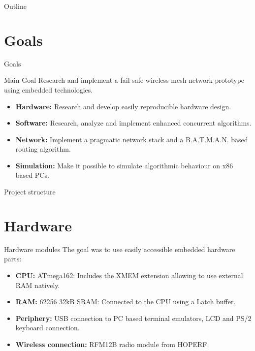 \begin{frame}
\titlepage
\end{frame}

\begin{frame}{Outline}
\tableofcontents
\end{frame}

\section{Goals}
\begin{frame}{Goals}

\begin{exampleblock}{Main Goal}
Research and implement a fail-safe wireless mesh network prototype using embedded technologies.
\end{exampleblock}

\begin{itemize}
    \item \textbf{Hardware:} Research and develop easily reproducible hardware design.
    \item \textbf{Software:} Research, analyze and implement enhanced concurrent algorithms.
    \item \textbf{Network:} Implement a pragmatic network stack and a B.A.T.M.A.N. based routing algorithm.
    \item \textbf{Simulation:} Make it possible to simulate algorithmic behaviour on x86 based PCs.
\end{itemize} 
\end{frame}

\begin{frame}{Project structure}
\begin{center}
\scalebox{0.56} {
}
\end{center}
\end{frame}

\section{Hardware}
\begin{frame}{Hardware modules}
The goal was to use easily accessible embedded hardware parts:

\begin{itemize}
    \item \textbf{CPU:} ATmega162: Includes the XMEM extension allowing to use external RAM natively.
    \item \textbf{RAM:} 62256 32kB SRAM: Connected to the CPU using a Latch buffer.
    \item \textbf{Periphery:} USB connection to PC based terminal emulators, LCD and PS/2 keyboard connection.
    \item \textbf{Wireless connection:} RFM12B radio module from HOPERF.
\end{itemize} 
\end{frame}

